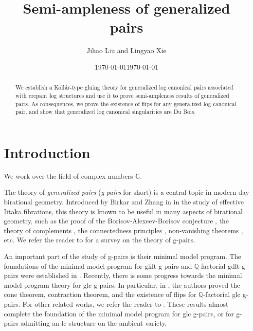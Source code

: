 \documentclass[11pt]{amsart}
\numberwithin{equation}{section}
\newcommand{\Qq}{\mathbb{Q}}
\theoremstyle{definition}
\theoremstyle{definition}
\theoremstyle{definition}
\begin{document}
\title{Semi-ampleness of generalized pairs}
\author{Jihao Liu and Lingyao Xie}


\address{Department of Mathematics, Northwestern University, 2033 Sheridan Rd, Evanston, IL 60208, USA}


\address{Department of Mathematics, The University of Utah, Salt Lake City, UT 84112, USA}


\date{\today}


\date{\today}

\begin{abstract}
We establish a Koll\'ar-type gluing theory for generalized log canonical pairs associated with crepant log structures and use it to prove semi-ampleness results of generalized pairs. As consequences, we prove the existence of flips for any generalized log canonical pair, and show that generalized log canonical singularities are Du Bois.
\end{abstract}


\maketitle
\tableofcontents

\section{Introduction}

We work over the field of complex numbers $\mathbb C$.

The theory of \emph{generalized pairs} (\emph{g-pairs} for short) is a central topic in modern day birational geometry. Introduced by Birkar and Zhang in \cite{BZ16} in the study of effective Iitaka fibrations, this theory is known to be useful in many aspects of birational geometry, such as the proof of the Borisov-Alexeev-Borisov conjecture \cite{Bir19,Bir21a}, the theory of complements \cite{Bir19,Sho20}, the connectedness principles \cite{Bir20,FS20}, non-vanishing theorems \cite{LPMTX22}, etc. We refer the reader to \cite{Bir21b} for a survey on the theory of g-pairs.

An important part of the study of g-pairs is their minimal model program. The foundations of the minimal model program for gklt g-pairs and $\mathbb Q$-factorial gdlt g-pairs were established in \cite{BZ16,HL22}. Recently, there is some progress towards the minimal model program theory for glc g-pairs. In particular, in \cite{HL21a}, the authors proved the cone theorem, contraction theorem, and the existence of flips for $\Qq$-factorial glc g-pairs. For other related works, we refer the reader to \cite{Has20b,LT21,Has22,LX22}. These results almost complete the foundation of the minimal model program for glc g-pairs, or for g-pairs admitting an lc structure on the ambient variety.
\end{document}
